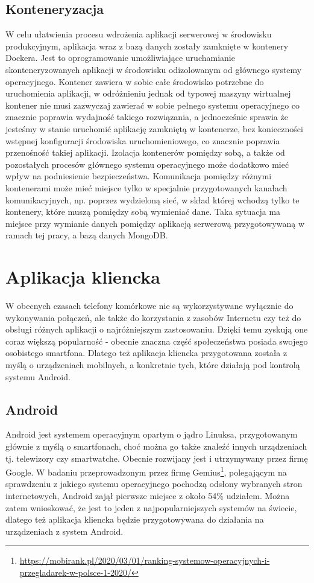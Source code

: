 \documentclass[a4paper,12pt,twoside,openany]{report}
\begin{document}
\subsection{Konteneryzacja}
W celu ułatwienia procesu wdrożenia aplikacji serwerowej w środowisku produkcyjnym, aplikacja wraz z bazą danych zostały zamknięte w kontenery Dockera. Jest to oprogramowanie  umożliwiające uruchamianie skonteneryzowanych aplikacji w środowisku odizolowanym od głównego systemy operacyjnego. Kontener zawiera w sobie całe środowisko potrzebne do uruchomienia aplikacji, w odróżnieniu jednak od typowej maszyny wirtualnej kontener nie musi zazwyczaj zawierać w sobie pełnego systemu operacyjnego co znacznie poprawia wydajność takiego rozwiązania, a jednocześnie sprawia że jesteśmy w stanie uruchomić aplikację zamkniętą w kontenerze, bez konieczności wstępnej konfiguracji środowiska uruchomieniowego, co znacznie poprawia przenośność takiej aplikacji. Izolacja kontenerów pomiędzy sobą, a także od pozostałych procesów głównego systemu operacyjnego może dodatkowo mieć wpływ na podniesienie bezpieczeństwa. Komunikacja pomiędzy różnymi kontenerami może mieć miejsce tylko w specjalnie przygotowanych kanałach komunikacyjnych, np. poprzez wydzieloną sieć, w skład której wchodzą tylko te kontenery, które muszą pomiędzy sobą wymieniać dane. Taka sytuacja ma miejsce przy wymianie danych pomiędzy aplikacją serwerową przygotowywaną w ramach tej pracy, a bazą danych MongoDB.


\section{Aplikacja kliencka}
W obecnych czasach telefony komórkowe nie są wykorzystywane wyłącznie do wykonywania połączeń, ale także do korzystania z zasobów Internetu czy też do obsługi różnych aplikacji o najróżniejszym zastosowaniu. Dzięki temu zyskują one coraz większą popularność - obecnie znaczna część społeczeństwa posiada swojego osobistego smartfona. Dlatego też aplikacja kliencka przygotowana została z myślą o urządzeniach mobilnych, a konkretnie tych, które działają pod kontrolą systemu Android. 

\subsection{Android}
Android jest systemem operacyjnym opartym o jądro Linuksa, przygotowanym głównie z myślą o smartfonach, choć można go także znaleźć innych urządzeniach tj. telewizory czy smartwatche. Obecnie rozwijany jest i utrzymywany przez firmę Google. W badaniu przeprowadzonym przez firmę Gemius\footnote{\url{https://mobirank.pl/2020/03/01/ranking-systemow-operacyjnych-i-przegladarek-w-polsce-1-2020/}}, polegającym na sprawdzeniu z jakiego systemu operacyjnego pochodzą odsłony wybranych stron internetowych, Android zajął pierwsze miejsce z około 54\% udziałem. Można zatem wnioskować, że jest to jeden z najpopularniejszych systemów na świecie, dlatego też aplikacja kliencka będzie przygotowywana do działania na urządzeniach z system Android. 
 
\end{document}
